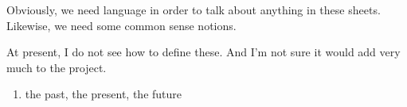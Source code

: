 
\sbasic

\sstart
{}

Obviously, we need language
in order to talk about anything
in these sheets.
Likewise, we need some common
sense notions.

At present, I do not see how to
define these. And I'm not sure
it would add very much to the project.

\begin{enumerate}
\item the past, the present, the future
\end{enumerate}
\strats
